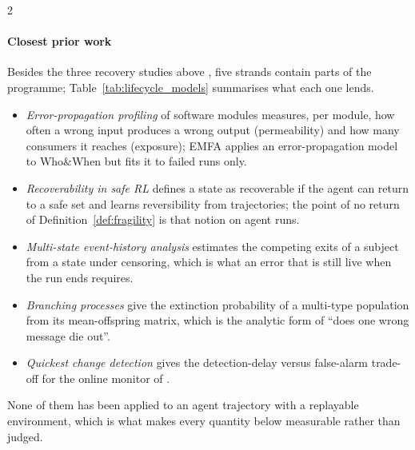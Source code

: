 \begin{multicols}{2}
\paragraph{Closest prior work} Besides the three recovery studies above \cite{huang2024resilience,jamshidi2026cascade,zhu2026toolmaze}, five strands contain parts of the programme; Table~\ref{tab:lifecycle_models} summarises what each one lends.
\begin{itemize}[leftmargin=1.1em]
\item \emph{Error-propagation profiling} of software modules \cite{hiller2004epic} measures, per module, how often a wrong input produces a wrong output (permeability) and how many consumers it reaches (exposure); EMFA \cite{liao2026emfa} applies an error-propagation model to Who\&When but fits it to failed runs only.
\item \emph{Recoverability in safe RL} \cite{moldovan2012safe,grinsztajn2021reversibility} defines a state as recoverable if the agent can return to a safe set and learns reversibility from trajectories; the point of no return of Definition~\ref{def:fragility} is that notion on agent runs.
\item \emph{Multi-state event-history analysis} \cite{putter2007multistate,andersen1982cox,aalen1978empirical} estimates the competing exits of a subject from a state under censoring, which is what an error that is still live when the run ends requires.
\item \emph{Branching processes} \cite{harris1963branching} give the extinction probability of a multi-type population from its mean-offspring matrix, which is the analytic form of ``does one wrong message die out''.
\item \emph{Quickest change detection} \cite{page1954cusum,lorden1971,tartakovsky2014sequential} gives the detection-delay versus false-alarm trade-off for the online monitor of .
\end{itemize}
None of them has been applied to an agent trajectory with a replayable environment, which is what makes every quantity below measurable rather than judged.
\end{multicols}

